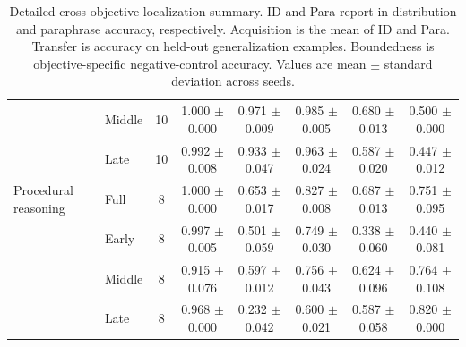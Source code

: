 \begin{table}[t]
\begin{tabular}{llcccccc}
 & Middle & 10 & 1.000 $\pm$ 0.000 & 0.971 $\pm$ 0.009 & 0.985 $\pm$ 0.005 & 0.680 $\pm$ 0.013 & 0.500 $\pm$ 0.000 \\
 & Late & 10 & 0.992 $\pm$ 0.008 & 0.933 $\pm$ 0.047 & 0.963 $\pm$ 0.024 & 0.587 $\pm$ 0.020 & 0.447 $\pm$ 0.012 \\
\addlinespace[0.35em]
Procedural reasoning & Full & 8 & 1.000 $\pm$ 0.000 & 0.653 $\pm$ 0.017 & 0.827 $\pm$ 0.008 & 0.687 $\pm$ 0.013 & 0.751 $\pm$ 0.095 \\
 & Early & 8 & 0.997 $\pm$ 0.005 & 0.501 $\pm$ 0.059 & 0.749 $\pm$ 0.030 & 0.338 $\pm$ 0.060 & 0.440 $\pm$ 0.081 \\
 & Middle & 8 & 0.915 $\pm$ 0.076 & 0.597 $\pm$ 0.012 & 0.756 $\pm$ 0.043 & 0.624 $\pm$ 0.096 & 0.764 $\pm$ 0.108 \\
 & Late & 8 & 0.968 $\pm$ 0.000 & 0.232 $\pm$ 0.042 & 0.600 $\pm$ 0.021 & 0.587 $\pm$ 0.058 & 0.820 $\pm$ 0.000 \\
\bottomrule
\end{tabular}
\caption{
Detailed cross-objective localization summary. ID and Para report in-distribution and paraphrase accuracy, respectively. Acquisition is the mean of ID and Para. Transfer is accuracy on held-out generalization examples. Boundedness is objective-specific negative-control accuracy. Values are mean $\pm$ standard deviation across seeds.
}
\label{tab:cross-objective-localization-appendix}
\end{table}
